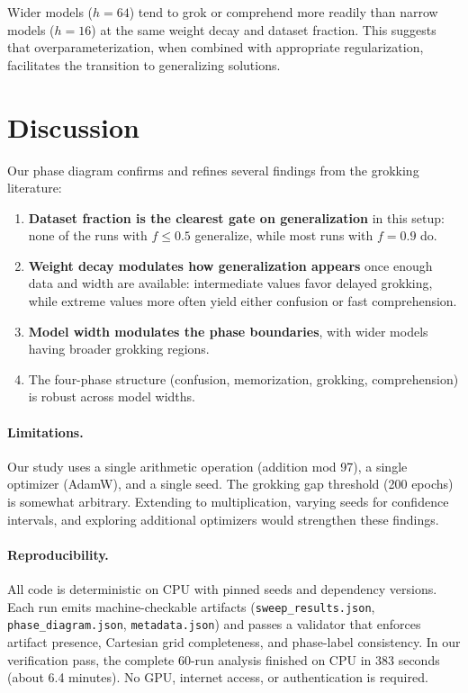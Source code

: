 \documentclass[11pt,a4paper]{article}
\begin{document}
Wider models ($h = 64$) tend to grok or comprehend more readily than narrow models ($h = 16$) at the same weight decay and dataset fraction. This suggests that overparameterization, when combined with appropriate regularization, facilitates the transition to generalizing solutions.

\section{Discussion}

Our phase diagram confirms and refines several findings from the grokking literature:

\begin{enumerate}
  \item \textbf{Dataset fraction is the clearest gate on generalization} in this setup: none of the runs with $f \leq 0.5$ generalize, while most runs with $f = 0.9$ do.
  \item \textbf{Weight decay modulates how generalization appears} once enough data and width are available: intermediate values favor delayed grokking, while extreme values more often yield either confusion or fast comprehension.
  \item \textbf{Model width modulates the phase boundaries}, with wider models having broader grokking regions.
  \item The four-phase structure (confusion, memorization, grokking, comprehension) is robust across model widths.
\end{enumerate}

\paragraph{Limitations.} Our study uses a single arithmetic operation (addition mod 97), a single optimizer (AdamW), and a single seed. The grokking gap threshold (200 epochs) is somewhat arbitrary. Extending to multiplication, varying seeds for confidence intervals, and exploring additional optimizers would strengthen these findings.

\paragraph{Reproducibility.} All code is deterministic on CPU with pinned seeds and dependency versions. Each run emits machine-checkable artifacts (\texttt{sweep\_results.json}, \texttt{phase\_diagram.json}, \texttt{metadata.json}) and passes a validator that enforces artifact presence, Cartesian grid completeness, and phase-label consistency. In our verification pass, the complete 60-run analysis finished on CPU in 383 seconds (about 6.4 minutes). No GPU, internet access, or authentication is required.
\end{document}
